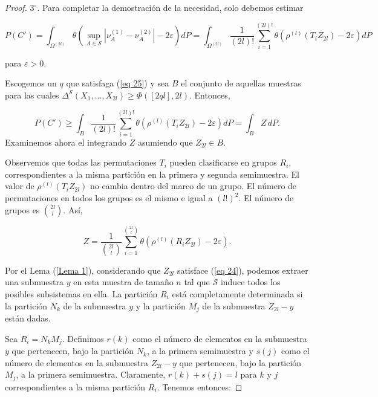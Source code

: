 \documentclass{report}
\begin{document}
\begin{proof}
\( 3^\circ \). Para completar la demostración de la necesidad, solo debemos estimar

\begin{equation*}
P(C') = \int_{\Omega^{(2l)}} \theta \left( \sup_{A \in \mathcal{S}} | \nu_A^{(1)} - \nu_A^{(2)} | - 2\varepsilon \right) dP
= \int_{\Omega^{(2l)}} \frac{1}{(2l)!} \sum_{i=1}^{(2l)!} \theta \left( \rho^{(l)} (T_i Z_{2l}) - 2\varepsilon \right) dP
\end{equation*}

para \( \varepsilon > 0 \).\newline

Escogemos un \( q \) que satisfaga (\ref{eq 25}) y sea \( B \) el conjunto de aquellas muestras para las cuales 
\( \Delta^{\mathcal{S}}(X_1, \dots, X_{2l}) \geq \Phi([ 2ql ], 2l) \). Entonces,

\begin{equation*}
P(C') \geq \int_B \frac{1}{(2l)!} \sum_{i=1}^{(2l)!} \theta \left( \rho^{(l)} (T_i Z_{2l}) - 2\varepsilon \right) dP
= \int_B Z \, dP.
\end{equation*}
Examinemos ahora el integrando \( Z \) asumiendo que \( Z_{2l} \in B \).\newline

Observemos que todas las permutaciones \( T_i \) pueden clasificarse en grupos \( R_i \),
correspondientes a la misma partición en la primera y segunda semimuestra.
El valor de \( \rho^{(l)} (T_i Z_{2l}) \) no cambia dentro del marco de un grupo.
El número de permutaciones en todos los grupos es el mismo e igual a \( (l!)^2 \).
El número de grupos es \( \binom{2l}{l} \). Así, 

\[
Z = \frac{1}{\binom{2l}{l}} \sum_{i=1}^{\binom{2l}{l}} \theta ( \rho^{(l)} (R_i Z_{2l}) - 2\varepsilon ).
\]

Por el Lema (\ref{Lema 1}), considerando que \( Z_{2l} \) satisface (\ref{eq 24}), podemos extraer una submuestra \( y \)
en esta muestra de tamaño \( n \) tal que \( \mathcal{S} \) induce todos los posibles subsistemas en ella.
La partición \( R_i \) está completamente determinada si la partición \( N_k \) de la submuestra \( y \)
y la partición \( M_j \) de la submuestra \( Z_{2l} - y \) están dadas.\newline

Sea \( R_i = N_k M_j \). Definimos \( r(k) \) como el número de elementos en la submuestra \( y \) que pertenecen,
bajo la partición \( N_k \), a la primera semimuestra y \( s(j) \) como el número de elementos en la submuestra
\( Z_{2l} - y \) que pertenecen, bajo la partición \( M_j \), a la primera semimuestra.
Claramente, \( r(k) + s(j) = l \) para \( k \) y \( j \) correspondientes a la misma partición \( R_i \).
Tenemos entonces:


\end{proof}
\end{document}
